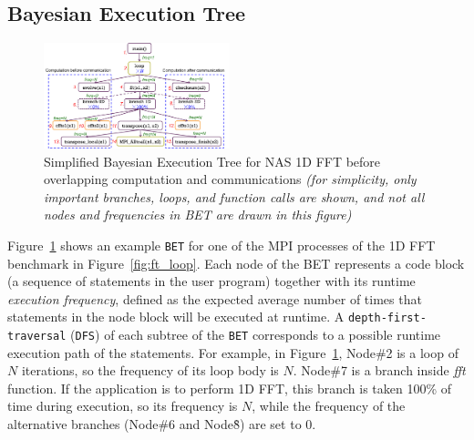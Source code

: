 \subsection {Bayesian Execution Tree}

\begin{figure}[h]
\begin{center}
\includegraphics[width=0.48\textwidth]{fig/ft_bet.png}
\caption{Simplified Bayesian Execution Tree for NAS 1D FFT before overlapping computation and communications
  \emph{(for simplicity, only important branches, loops, and function calls are shown, and not all nodes and frequencies in BET are drawn in this figure)}
}
\label{fig:ft_bet}
\end{center}
\end{figure}

Figure~\ref{fig:ft_bet} shows an example \texttt{BET} for one of the MPI processes of the 1D FFT benchmark in Figure~\ref{fig:ft_loop}.
Each node of the BET represents a code block (a sequence of statements in the user program) together with its runtime \emph{execution frequency}, defined as the expected average number of times that statements in the node block will be executed at runtime.
A \texttt{depth-first-traversal} (\texttt{DFS}) of each subtree of the \texttt{BET} corresponds to a possible runtime execution path of the statements.
For example, in Figure~\ref{fig:ft_bet}, Node\#2 is a loop of $N$ iterations, so the frequency of its loop body is $N$.
Node\#7 is a branch inside {\em fft} function. If the application is to perform 1D FFT,  this branch is taken 100\% of time during execution,
so its frequency is $N$, while the frequency of the alternative branches (Node\#6 and Node\^8) are set to 0.


